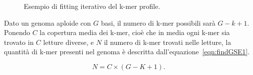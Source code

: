 \documentclass[crop=false, class=book]{standalone}
\begin{document}
	\begin{figure}[h]
		\centering
		 \quad
		 \quad
		\caption{Esempio di fitting iterativo del k-mer profile.}
		\label{fig:findGSEfitting}
	\end{figure}


	Dato un genoma aploide con $G$ basi, il numero di k-mer possibili sarà $G-k+1$. Ponendo $C$ la copertura media dei k-mer, cioè che in media ogni k-mer sia trovato in $C$ letture diverse, e $N$ il numero di k-mer trovati nelle letture, la quantità di k-mer presenti nel genoma è descritta dall'equazione~\vref{eqn:findGSE1}. 	
	
	\begin{equation}
		\label{eqn:findGSE1}
		N=C \times (G-K+1).
	\end{equation}
		
\end{document}
